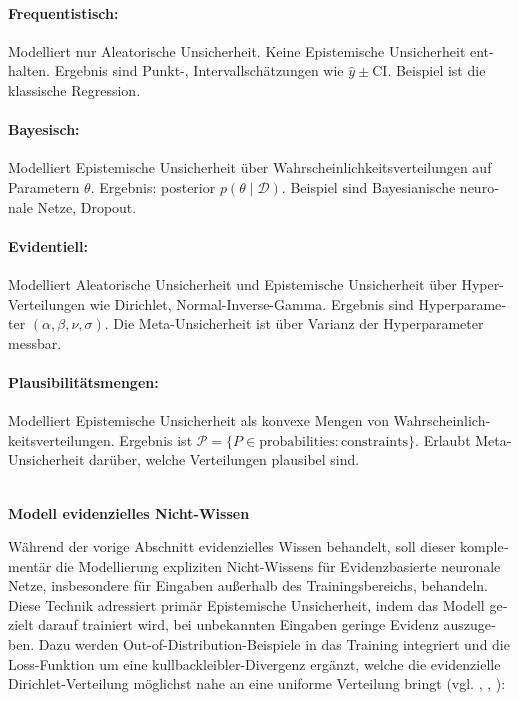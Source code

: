 \begin{otherlanguage}{ngerman}
\paragraph{Frequentistisch:} Modelliert nur \gls{Aleatorische Unsicherheit}. Keine \gls{Epistemische Unsicherheit} enthalten. Ergebnis sind Punkt-, Intervallschätzungen wie 
\(\hat{y} \pm \text{CI}\). Beispiel ist die klassische Regression.

\paragraph{Bayesisch:} Modelliert \gls{Epistemische Unsicherheit} über Wahrscheinlichkeitsverteilungen auf Parametern \(\theta\). Ergebnis: posterior 
\(p(\theta \mid \mathcal{D})\). Beispiel sind \gls{Bayesianische neuronale Netze}, Dropout.

\paragraph{Evidentiell:} Modelliert \gls{Aleatorische Unsicherheit} und \gls{Epistemische Unsicherheit} über Hyper-Verteilungen wie Dirichlet, Normal-Inverse-Gamma. Ergebnis sind  Hyperparameter \((\alpha, \beta, \nu, \sigma)\). Die Meta-Unsicherheit ist über Varianz der Hyperparameter messbar.

\paragraph{Plausibilitätsmengen:} Modelliert \gls{Epistemische Unsicherheit} als konvexe Mengen von Wahrscheinlichkeitsverteilungen. Ergebnis ist  
\(\mathcal{P} = \{ P \in \text{probabilities} : \text{constraints} \}\). Erlaubt Meta-Unsicherheit darüber, welche Verteilungen plausibel sind.

\par\noindent\\



\textbf{Modell evidenzielles Nicht-Wissen}

Während der vorige Abschnitt evidenzielles Wissen behandelt, soll dieser komplementär die Modellierung expliziten Nicht-Wissens für \gls{Evidenzbasierte neuronale Netze}, insbesondere für Eingaben außerhalb des Trainingsbereichs, behandeln. Diese Technik adressiert primär \gls{Epistemische Unsicherheit}, indem das Modell gezielt darauf trainiert wird, bei unbekannten Eingaben geringe Evidenz auszugeben. Dazu werden \gls{Out-of-Distribution}-Beispiele in das Training integriert und die Loss-Funktion um eine \gls{kullbackleibler}-Divergenz ergänzt, welche die evidenzielle Dirichlet-Verteilung möglichst nahe an eine uniforme Verteilung bringt (vgl. \parencite[S.3, Z.22-28]{malinin2019uncertainty}, \parencite[S.4, Z.10-16]{amini2020deep}, \parencite[S.4, Z.5-15]{ovadia2019can}):


\end{otherlanguage}
